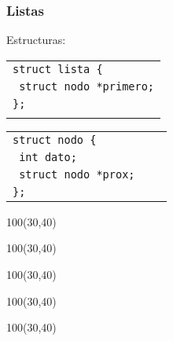 \documentclass[aspectratio=169]{beamer}
\begin{document}
\begin{frame}[t]
    \frametitle{Listas}
    Estructuras:
    \begin{multicols}{2}
    \begin{tabular}{l}
    \texttt{struct lista \{}      \\
    \texttt{      struct nodo *primero;} \\
    \texttt{\};}                  \\
    \hspace{4cm}
    \end{tabular}
    \columnbreak
    \begin{tabular}{lll}
    \texttt{struct nodo \{}     \\
    \texttt{      int dato;}    \\
    \texttt{      struct nodo *prox;}  \\
    \texttt{\};}                \\
    \end{tabular}
    \end{multicols}
    \begin{textblock}{100}(30,40)  \end{textblock}
    \begin{textblock}{100}(30,40)  \end{textblock}
    \begin{textblock}{100}(30,40)  \end{textblock}
    \begin{textblock}{100}(30,40)  \end{textblock}
    \begin{textblock}{100}(30,40)  \end{textblock}
\end{frame}
\end{document}
